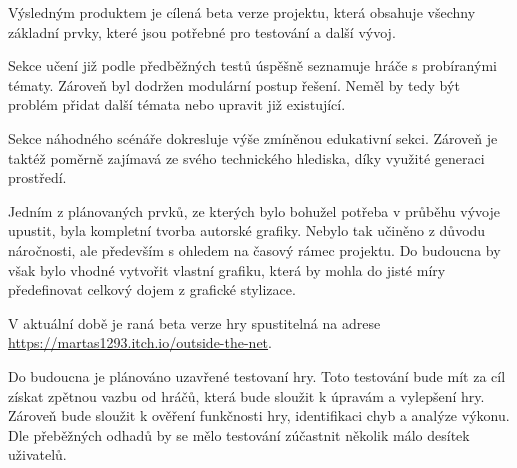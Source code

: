Výsledným produktem je cílená beta verze projektu, která obsahuje všechny základní prvky, které jsou potřebné pro testování a další vývoj.

Sekce učení již podle předběžných testů úspěšně seznamuje hráče s probíranými tématy. Zároveň byl dodržen modulární postup řešení. Neměl by tedy být problém přidat další témata nebo upravit již existující.

Sekce náhodného scénáře dokresluje výše zmíněnou edukativní sekci. Zároveň je taktéž poměrně zajímavá ze svého technického hlediska, díky využité generaci prostředí.

Jedním z plánovaných prvků, ze kterých bylo bohužel potřeba v průběhu vývoje upustit, byla kompletní tvorba autorské grafiky. Nebylo tak učiněno z důvodu náročnosti, ale především s ohledem na časový rámec projektu. Do budoucna by však bylo vhodné vytvořit vlastní grafiku, která by mohla do jisté míry předefinovat celkový dojem z grafické stylizace.

V aktuální době je raná beta verze hry spustitelná na adrese \url{https://martas1293.itch.io/outside-the-net}.

Do budoucna je plánováno uzavřené testovaní hry. Toto testování bude mít za cíl získat zpětnou vazbu od hráčů, která bude sloužit k úpravám a vylepšení hry. Zároveň bude sloužit k ověření funkčnosti hry, identifikaci chyb a analýze výkonu. Dle přeběžných odhadů by se mělo testování zúčastnit několik málo desítek uživatelů.